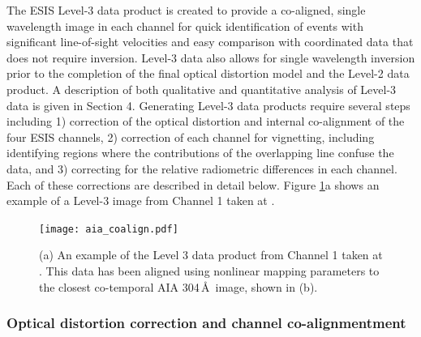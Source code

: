     	The ESIS Level-3 data product is created to provide a co-aligned, single wavelength image in each channel for quick identification of events with significant line-of-sight velocities and easy comparison with coordinated data that does not require inversion. 
    	Level-3 data also allows for single wavelength inversion prior to the completion of the final optical distortion model and the Level-2 data product.  A description of both qualitative and quantitative analysis of Level-3 data is given in Section 4.  Generating Level-3 data products require several steps including 1) correction of the optical distortion and internal co-alignment of the four ESIS channels, 2) correction of each channel for vignetting, including identifying regions where the contributions of the overlapping \mgxbright line confuse the \ov data, and 3) correcting for the relative radiometric differences in each channel.  Each of these corrections are described in detail below. 
    	Figure \ref{fig:coalign}a shows an example of a Level-3 image from Channel 1 taken at \levthreetime.
    	
  		\begin{figure}[htb!]
    		\centering
    		\texttt{[image: aia\_coalign.pdf]}
    		\caption{(a) An example of the Level 3 data product from Channel 1 taken at \levthreetime. This data has been aligned using nonlinear mapping parameters to the closest co-temporal AIA 304\,\AA\ image, shown in (b).   }
    		\label{fig:coalign}
    	\end{figure}
    	
    
  
  \subsubsection{Optical distortion correction and channel co-alignmentment}
   		
